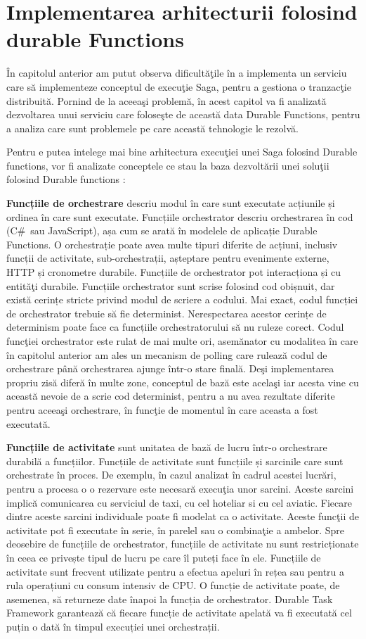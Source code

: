 \section{Implementarea arhitecturii folosind durable Functions}
\quad În capitolul anterior am putut observa dificultăţile în a implementa un serviciu care să implementeze conceptul de execuţie Saga, pentru a gestiona o tranzacţie distribuită. Pornind de la aceeaşi problemă, în acest capitol va fi analizată dezvoltarea unui serviciu care foloseşte de această data Durable Functions, pentru a analiza care sunt problemele pe care această tehnologie le rezolvă.
\par Pentru e putea intelege mai bine arhitectura execuţiei unei Saga folosind Durable functions, vor fi analizate conceptele ce stau la baza dezvoltării unei soluţii folosind Durable functions :
\par \textbf{Funcțiile de orchestrare} descriu modul în care sunt executate acțiunile și ordinea în care sunt executate. Funcțiile orchestrator descriu orchestrarea în cod (C\#\ sau JavaScript), așa cum se arată în modelele de aplicație Durable Functions. O orchestrație poate avea multe tipuri diferite de acțiuni, inclusiv funcții de activitate, sub-orchestrații, așteptare pentru evenimente externe, HTTP și cronometre durabile. Funcțiile de orchestrator pot interacționa și cu entităţi durabile. Funcțiile orchestrator sunt scrise folosind cod obișnuit, dar există cerințe stricte privind modul de scriere a codului. Mai exact, codul funcției de orchestrator trebuie să fie determinist. Nerespectarea acestor cerințe de determinism poate face ca funcțiile orchestratorului să nu ruleze corect. Codul funcţiei orchestrator este rulat de mai multe ori, asemănator cu modalitea în care în capitolul anterior am ales un mecanism de polling care rulează codul de orchestrare până orchestrarea ajunge într-o stare finală. Deşi implementarea propriu zisă diferă în multe zone, conceptul de bază este acelaşi iar acesta vine cu această nevoie de a scrie cod determinist, pentru a nu avea rezultate diferite pentru aceeaşi orchestrare, în funcţie de momentul în care aceasta a fost executată.
\par \textbf{Funcțiile de activitate}  sunt unitatea de bază de lucru într-o orchestrare durabilă a funcțiilor. Funcțiile de activitate sunt funcțiile și sarcinile care sunt orchestrate în proces. De exemplu, în cazul analizat în cadrul acestei lucrări, pentru a procesa o o rezervare este necesară execuţia unor sarcini. Aceste sarcini implică comunicarea cu serviciul de taxi, cu cel hoteliar si cu cel aviatic. Fiecare dintre aceste sarcini individuale poate fi modelat ca o activitate. Aceste funcţii de activitate pot fi executate în serie, în parelel sau o combinaţie a ambelor. Spre deosebire de funcțiile de orchestrator, funcțiile de activitate nu sunt restricționate în ceea ce privește tipul de lucru pe care îl puteți face în ele. Funcțiile de activitate sunt frecvent utilizate pentru a efectua apeluri în rețea sau pentru a rula operațiuni cu consum intensiv de CPU. O funcție de activitate poate, de asemenea, să returneze date înapoi la funcția de orchestrator. Durable Task Framework garantează că fiecare funcție de activitate apelată va fi executată cel puțin o dată în timpul execuției unei orchestrații.
